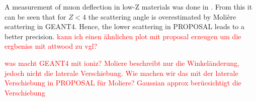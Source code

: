 A measurement of muon deflection in low-Z materials was done in \cite{attwood_2006}. 
From this it can be seen that for $Z < 4$ the scattering angle is overestimated 
by Molière scattering in GEANT4. Hence, the lower scattering in PROPOSAL leads 
to a better precision.
\textcolor{red}{kann ich einen ähnlichen plot mit proposal erzeugen um die 
ergbeniss mit attwood zu vgl?}



\textcolor{red}{was macht GEANT4 mit ioniz?}
\textcolor{red}{Moliere beschreibt nur die Winkeländerung, jedoch nicht die laterale Verschiebung. Wie machen wir das mit der 
laterale Verschiebung in PROPOSAL für Moliere? Gaussian approx berücsichtigt die Verschiebung}


